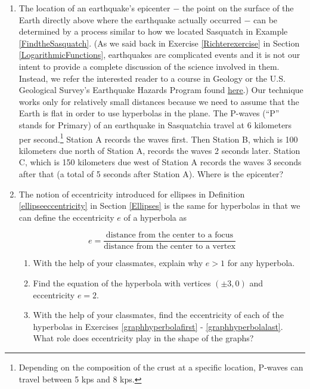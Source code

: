 \documentclass{ximera}
\begin{document}
\begin{enumerate}

\setcounter{enumi}{\value{HW}}



\item The location of an earthquake's epicenter $-$ the point on the surface of the Earth directly above where the earthquake actually occurred $-$ can be determined by a process similar to how we located Sasquatch in Example \ref{FindtheSasquatch}.  (As we said back in Exercise \ref{Richterexercise} in Section \ref{LogarithmicFunctions}, earthquakes are complicated events and it is not our intent to provide a complete discussion of the science involved in them.  Instead, we refer the interested reader to a course in Geology or the U.S. Geological Survey's Earthquake Hazards Program found \href{http://earthquake.usgs.gov/}{\underline{here}}.)  Our technique works only for relatively small distances because we need to assume that the Earth is flat in order to use hyperbolas in the plane.  The P-waves (``P'' stands for Primary) of an earthquake in Sasquatchia travel at 6 kilometers per second.\footnote{Depending on the composition of the crust at a specific location, P-waves can travel between 5 kps and 8 kps.}  Station A records the waves first. Then Station B, which is 100 kilometers due north of Station A, records the waves 2 seconds later.  Station C, which is 150 kilometers due west of Station A records the waves 3 seconds after that (a total of 5 seconds after Station A). Where is the epicenter?

\item \label{hyperbolaeccentricity} The notion of eccentricity introduced for ellipses in Definition \ref{ellipseeccentricity} in Section \ref{Ellipses} is the same for hyperbolas in that we can define the eccentricity $e$ of a hyperbola as 

\[  e = \dfrac{\mbox{distance from the center to a focus}}{\mbox{distance from the center to a vertex}} \]
  

\begin{enumerate}

\item  With the help of your classmates, explain why $e > 1$ for any hyperbola.

\item  Find the equation of the hyperbola with vertices $(\pm 3,0)$ and eccentricity $e = 2$.

\item  With the help of your classmates, find the eccentricity of each of the hyperbolas in  Exercises \ref{graphhyperbolafirst} - \ref{graphhyperbolalast}.  What role does eccentricity play in the shape of the graphs?


\end{enumerate}
\end{enumerate}
\end{document}
